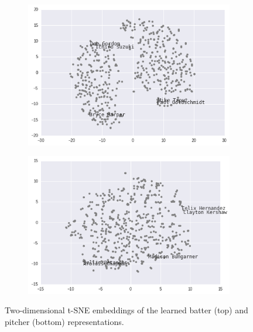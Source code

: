 \documentclass{article}
\begin{document}
\begin{figure}[h]
\captionsetup[subfigure]{labelformat=empty}
\centering

    \begin{subfigure}[b]{0.75\textwidth}
    \includegraphics[width=1\linewidth]{batter_tsne.png}
    \caption{}
    \end{subfigure}

    \begin{subfigure}[b]{0.75\textwidth}
    \includegraphics[width=1\linewidth]{pitcher_tsne.png}
    \caption{}
    \end{subfigure}

\caption{Two-dimensional t-SNE embeddings of the learned batter (top) and pitcher (bottom) representations.}
\label{fig:tsne}
\end{figure}
\end{document}
